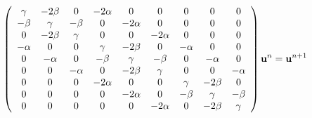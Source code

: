 \begin{align}\label{linear_system_BE2D}
  \left(\begin{array}{c c c c c c c c c}
        \gamma & -2\beta &0 &-2\alpha &0 &0 &0 &0 &0\\
        -\beta & \gamma & -\beta &0 &-2\alpha &0 &0 &0 &0\\
        0&-2\beta & \gamma & 0 & 0 & -2\alpha &0&0&0\\
        -\alpha& 0&0 & \gamma & -2\beta & 0 & -\alpha &0&0\\
        0& -\alpha&0&-\beta & \gamma & -\beta & 0 & -\alpha &0\\
        0& 0& -\alpha&0&-2\beta & \gamma & 0 & 0 &-\alpha\\
        0& 0 &0 &-2\alpha &0&0 & \gamma & -2\beta&0\\
        0& 0 &0 &0 &-2\alpha&0&-\beta & \gamma &-\beta\\
         0&0 &0 &0&0 &-2\alpha&0&-2\beta & \gamma
       \end{array}\right)\mathbf{u}^{n} = \mathbf{u}^{n+1}
\end{align}
